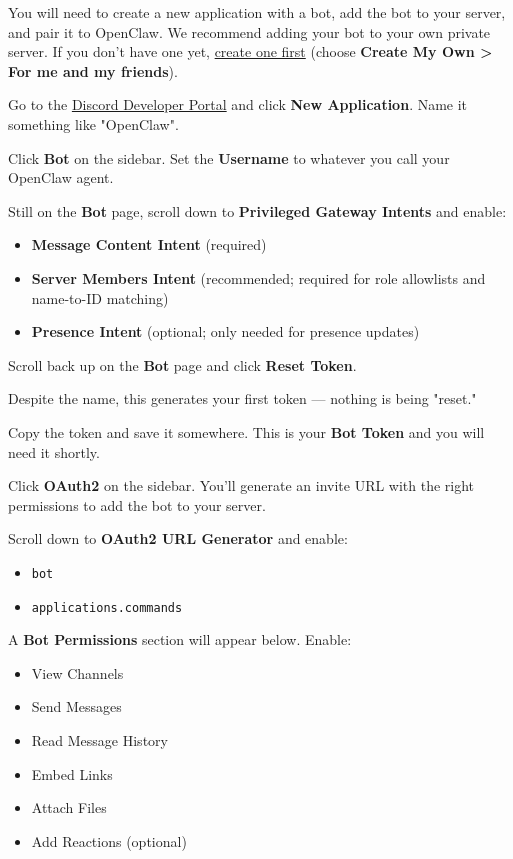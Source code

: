 You will need to create a new application with a bot, add the bot to your server, and pair it to OpenClaw. We recommend adding your bot to your own private server. If you don't have one yet, \href{https://support.discord.com/hc/en-us/articles/204849977-How-do-I-create-a-server}{create one first} (choose \textbf{Create My Own > For me and my friends}).

Go to the \href{https://discord.com/developers/applications}{Discord Developer Portal} and click \textbf{New Application}. Name it something like "OpenClaw".

Click \textbf{Bot} on the sidebar. Set the \textbf{Username} to whatever you call your OpenClaw agent.


Still on the \textbf{Bot} page, scroll down to \textbf{Privileged Gateway Intents} and enable:

\begin{itemize}
  \item \textbf{Message Content Intent} (required)
  \item \textbf{Server Members Intent} (recommended; required for role allowlists and name-to-ID matching)
  \item \textbf{Presence Intent} (optional; only needed for presence updates)
\end{itemize}



Scroll back up on the \textbf{Bot} page and click \textbf{Reset Token}.

Despite the name, this generates your first token — nothing is being "reset."

Copy the token and save it somewhere. This is your \textbf{Bot Token} and you will need it shortly.


Click \textbf{OAuth2} on the sidebar. You'll generate an invite URL with the right permissions to add the bot to your server.

Scroll down to \textbf{OAuth2 URL Generator} and enable:

\begin{itemize}
  \item \texttt{bot}
  \item \texttt{applications.commands}
\end{itemize}


A \textbf{Bot Permissions} section will appear below. Enable:

\begin{itemize}
  \item View Channels
  \item Send Messages
  \item Read Message History
  \item Embed Links
  \item Attach Files
  \item Add Reactions (optional)
\end{itemize}



